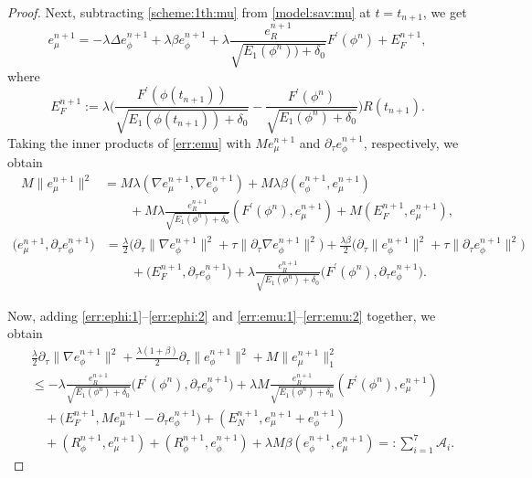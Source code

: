 \documentclass[10pt,a4paper]{amsart}
\newcommand{\malA}{\mathcal{A}}
\newcommand{\p}{\partial}
\begin{document}
\begin{proof}
	Next, subtracting \eqref{scheme:1th:mu} from \eqref{model:sav:mu} at $t=t_{n+1}$, we get
	\begin{equation}  \label{err:emu}
		e_\mu^{n+1}=- \lambda\Delta e_\phi^{n+1}+ \lambda \beta e_\phi^{n+1} + \lambda \frac{e_R^{n+1}}{\sqrt{E_1(\phi^{n}))+\delta_0}} F^{\prime}(\phi^{n})+E_F^{n+1},
	\end{equation} 
	where  
	\begin{equation*}  
		E_F^{n+1}:=\lambda  \Big(\frac{F^{\prime}(\phi(t_{n+1}))}{\sqrt{E_1(\phi(t_{n+1}))+\delta_0}}-\frac{F^{\prime}(\phi^n)}{\sqrt{E_1(\phi^n)+\delta_0}}\Big) R(t_{n+1}).
	\end{equation*} 
	Taking the inner products of \eqref{err:emu} with $M e_\mu^{n+1}$ and $\p_\tau e_\phi^{n+1}$, respectively, we obtain
	\begin{equation} \label{err:emu:1}
		\begin{aligned}
			M\|e_\mu^{n+1}\|^2 
			& =    M \lambda(\nabla e_\mu^{n+1}, \nabla e_\phi^{n+1}) +M  \lambda 
			\beta(e_\phi^{n+1},e_\mu^{n+1}) \\
			&\qquad +M \lambda  \frac{ e_R^{n+1}}{\sqrt{E_1(\phi^{n})+\delta_0}}(F^{\prime}(\phi^{n}), e_\mu^{n+1})+M(E_F^{n+1}, e_\mu^{n+1}),
		\end{aligned}
	\end{equation}
	\begin{equation} \label{err:emu:2}
		\begin{aligned}
			\big( e_\mu^{n+1},\p_\tau  e_\phi^{n+1}\big)
			& =  \frac{\lambda }{2}\big( \p_\tau \|\nabla e_\phi^{n+1}\|^2 + \tau\|\p_\tau  \nabla e_\phi^{n+1}\|^2\big)  
			+  \frac{\lambda \beta}{2}\big( \p_\tau\| e_\phi^{n+1}\|^2 + \tau\|\p_\tau   e_\phi^{n+1}\|^2\big)\\
			& \qquad  +\big(E_F^{n+1}, \p_\tau  e_\phi^{n+1}\big) + \lambda \frac{e_R^{n+1}}{\sqrt{E_1(\phi^{n})+\delta_0}} \big(F^{\prime}(\phi^{n}),\p_\tau  e_\phi^{n+1}\big)   .
		\end{aligned}
	\end{equation}
	
	
	Now, adding \eqref{err:ephi:1}--\eqref{err:ephi:2} and \eqref{err:emu:1}--\eqref{err:emu:2} together, we obtain
	\begin{equation} \label{err:CH:all:e1}
		\begin{aligned}
			&\frac{\lambda }{2}  \p_\tau \|\nabla e_\phi^{n+1}\|^2 %
			+\frac{\lambda (1+\beta)}{2}  \p_\tau\| e_\phi^{n+1}\|^2 %
			+ M\| e_\mu^{n+1}\|_1^2 \\
			&  \le - \lambda \frac{e_R^{n+1}}{\sqrt{E_1(\phi^{n})+\delta_0}} \big(F^{\prime}(\phi^{n}),\p_\tau  e_\phi^{n+1}\big)+\lambda M   \frac{e_R^{n+1}}{\sqrt{E_1(\phi^{n})+\delta_0}}(F^{\prime}(\phi^{n}), e_\mu^{n+1}) \\
			& \quad +\big(E_F^{n+1}, M e_\mu^{n+1}-\p_\tau  e_\phi^{n+1}\big)+ (E_N^{n+1}, e_\mu^{n+1}+e_\phi^{n+1}) \\
			& \quad  +(R_\phi^{n+1}, e_\mu^{n+1})+(R_\phi^{n+1}, e_\phi^{n+1})+ \lambda M\beta(e_\phi^{n+1},e_\mu^{n+1})
			=:\sum\limits_{i=1}^7\malA_i.
		\end{aligned}
	\end{equation}
	

\end{proof}
\end{document}
